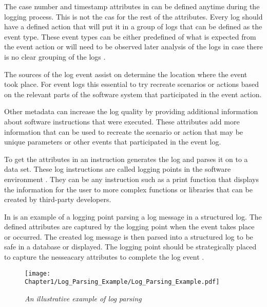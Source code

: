 The case number and timestamp attributes in  can be defined anytime during the logging process. This is not the cas for the rest of the attributes. Every log should have a defined action that will put it in a group of logs that can be defined as the event type. These event types can be either predefined of what is expected from the event action or will need to be observed later analysis of the logs in case there is no clear grouping of the logs \cite{Bekeneva2020, Fedaghi2010}.\par The sources of the log event assist on determine the location where the event took place. For event logs this essential to try recreate scenarios or actions based on the relevant parts of the software system that participated in the event action.\par Other metadata can increase the log quality by providing additional information about software instructions that were executed. These attributes add more information that can be used to recreate the scenario or action that may be unique parameters or other events that participated in the event log.\par To get the attributes in  an instruction generates the log and parses it on to a data set. These log instructions are called logging points in the software environment \cite{Pecchia2015, Zhu2015}. They can be any instruction such as a print function that displays the information for the user to more complex functions or libraries that can be created by third-party developers.

\clearpage

In  is an example of a logging point parsing a log message in a structured log. The defined attributes are captured by the logging point when the event takes place or occurred. The created log message is then parsed into a structured log to be safe in a database or displayed. The logging point should be strategically placed to capture the nesseacary attributes to complete the log event \cite{Fedaghi2010}.

\begin{figure}[!htb] %
	\centering %
	\texttt{[image: Chapter1/Log\_Parsing\_Example/Log\_Parsing\_Example.pdf]}
	\caption[An illustrative example of log parsing]
	{\textit{An illustrative example of log parsing \cite{Zhu2019}}} \label{fig:Log_Parsing}
\end{figure}

